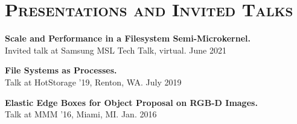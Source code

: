 \documentclass[10pt, letterpaper]{article}
\renewenvironment{itemize}{
  \begin{list}{}{
    \setlength{\leftmargin}{1.2em}
    \setlength{\itemsep}{0.12em}
    \setlength{\parskip}{0pt}
    \setlength{\parsep}{0.12em}
  }
}{
  \end{list}
}
\begin{document}
\section*{\textsc{Presentations and Invited Talks}}
\begin{itemize}
       \item {\bf{Scale and Performance in a Filesystem Semi-Microkernel.}} \\
        {\small{Invited talk at {{Samsung MSL Tech Talk}}, virtual.}} \hfill June 2021
       \item {\bf{File Systems as Processes.}} \\
        {\small{Talk at HotStorage '19, Renton, WA.}} \hfill July 2019
       \item {\bf{Elastic Edge Boxes for Object Proposal on RGB-D Images.}} \\
     {\small{Talk at MMM '16, Miami, MI.}}  \hfill Jan. 2016
\end{itemize}

\end{document}
